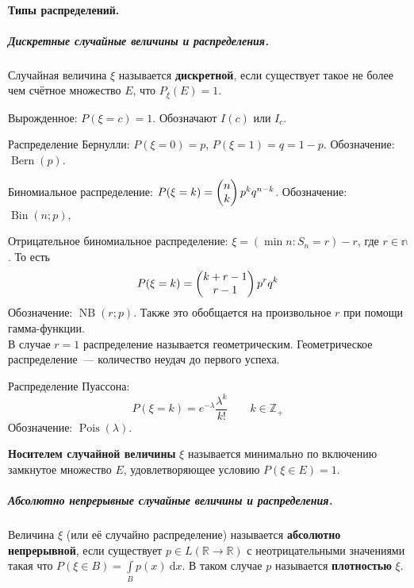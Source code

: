 \documentclass{article}
\begin{document}
    \paragraph{Типы распределений.}
    \subparagraph{Дискретные случайные величины и распределения.}
    \begin{definition}
        Случайная величина $\xi$ называется \textbf{дискретной}, если существует такое не более чем счётное множество $E$, что $P_\xi(E)=1$.
    \end{definition}
    \begin{example}
        Вырожденное: $P(\xi=c)=1$. Обозначают $I(c)$ или $I_c$.
    \end{example}
    \begin{example}
        Распределение Бернулли: $P(\xi=0)=p$, $P(\xi=1)=q=1-p$. Обозначение: $\operatorname{Bern}(p)$.
    \end{example}
    \begin{example}
        Биномиальное распределение: $P(\xi=k)=\left(\begin{matrix}n\\k\end{matrix}\right) p^kq^{n-k}$. Обозначение: $\operatorname{Bin}(n;p)$,
    \end{example}
    \begin{example}
        Отрицательное биномиальное распределение: $\xi=(\min n:S_n=r)-r$, где $r\in\mathbb n$. То есть
        $$
        P(\xi=k)=\left(\begin{matrix}k+r-1\\r-1\end{matrix}\right)p^{r}q^{k}
        $$
        Обозначение: $\operatorname{NB}(r;p)$. Также это обобщается на произвольное $r$ при помощи гамма-функции.\\
        В случае $r=1$ распределение называется геометрическим. Геометрическое распределение~--- количество неудач до первого успеха.
    \end{example}
    \begin{example}
        Распределение Пуассона:
        $$
        P(\xi=k)=e^{-\lambda}\frac{\lambda^k}{k!}\qquad k\in\mathbb Z_+
        $$
        Обозначение: $\operatorname{Pois}(\lambda)$.
    \end{example}
    \begin{definition}
        \textbf{Носителем случайной величины} $\xi$ называется минимально по включению замкнутое множество $E$, удовлетворяющее условию $P(\xi\in E)=1$.
    \end{definition}
    \subparagraph{Абсолютно непрерывные случайные величины и распределения.}
    \begin{definition}
        Величина $\xi$ (или её случайно распределение) называется \textbf{абсолютно непрерывной},  если существует $p\in L(\mathbb R\to\mathbb R)$ с неотрицательными значениями такая что $P(\xi\in B)=\int\limits_Bp(x)~\mathrm dx$. В таком случае $p$ называется \textbf{плотностью} $\xi$.
    \end{definition}
\end{document}
